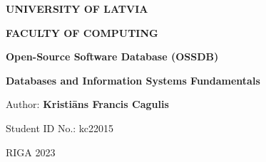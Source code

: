 \begin{titlepage}
    \thispagestyle{empty}
    \begin{center}
        \vspace*{2cm}
        \begin{large}\textbf{UNIVERSITY OF LATVIA}

            \textbf{FACULTY OF COMPUTING}

            \vfill
            \textbf{Open-Source Software Database (OSSDB)}
        \end{large}

        \vfill
        \textbf{Databases and Information Systems Fundamentals}
    \end{center}
    \vspace{4cm}
    \begin{flushright}
        Author: \textbf{Kristiāns Francis Cagulis}

        Student ID No.: kc22015

    \end{flushright}
    \vspace{1cm}
    \begin{center}
        RIGA 2023
    \end{center}
\end{titlepage}
